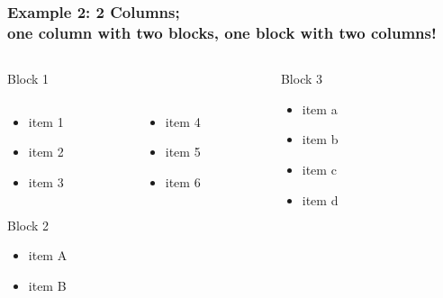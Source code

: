 \documentclass[mathserif]{beamer}
\begin{document}
\begin{frame}
\frametitle{Example 2: 2 Columns;\\ one column with two blocks, one block with two columns!}
\begin{columns}[c]
\begin{column}{5cm}
\begin{block}{Block 1}
\begin{columns}[t]
\begin{column}{2.25cm}
\begin{itemize}
\item item 1\\
\item item 2\\
\item item 3\\
\end{itemize}
\end{column}
\begin{column}{2.75cm}
\begin{itemize}
\item item 4\\
\item item 5\\
\item item 6\\
\end{itemize}
\end{column}
\end{columns}
\end{block}
\begin{block}{Block 2}
\begin{itemize}
\item item A\\
\item item B\\
\end{itemize}
\end{block}
\end{column}
\begin{column}{5cm}
\begin{block}{Block 3}
\begin{itemize}
\item item a\\
\item item b\\
\item item c\\
\item item d\\
\end{itemize}
\end{block}
\end{column}
\end{columns}
\end{frame}
\end{document}
